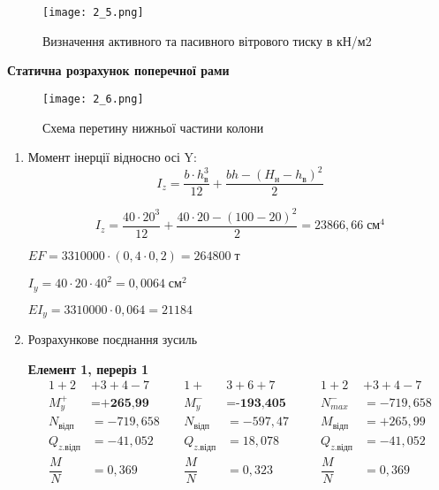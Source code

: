 \documentclass[a4paper,14pt]{article}
\begin{document}
\begin{figure}[h!]
    \begin{center}
        \texttt{[image: 2\_5.png]}
        \caption{Визначення активного та пасивного вітрового тиску в кН/м2}\label{ris2_5} 
    \end{center}
\end{figure}
\textbf{Статична розрахунок поперечної рами} 
\begin{figure}[h!]
    \begin{center}
        \texttt{[image: 2\_6.png]}
        \caption{Схема перетину нижньої частини колони}\label{ris2_6} 
    \end{center}
\end{figure}
\begin{enumerate}
    \item Момент інерції відносно осі Y:
    \begin{equation}
        I_z = \dfrac{b\cdot h^3_\textit{в}}{12}+\dfrac{bh-(H_\textit{н}-h_\textit{в})^2}{2} 
    \end{equation}
    
    $$I_z = \dfrac{40\cdot 20^3}{12}+\dfrac{40\cdot 20-(100-20)^2}{2}=23866,66\;\textit{см}^4$$

    $EF=3310000\cdot (0,4\cdot 0,2) = 264800\;\textit{т}$

    $I_y = 40 \cdot 20\cdot 40^2 = 0,0064\;\textit{см}^2$

    $EI_y = 3310000\cdot 0,064 = 21184$

    \item Розрахункове поєднання зусиль
    
    \textbf{Елемент 1, переріз 1}
    \begin{equation*}
        \begin{aligned}
        1+2&+3+4-7\qquad  &1+&3+6+7 &1+2&+3+4-7\\
        M^+_y &= \textbf{+265,99} &M^-_y &= \textbf{-193,405}\qquad &N^-_{max} &= -719,658\\
        N_\textit{відп} &= -719,658  &N_\textit{відп} &= -597,47 &M_\textit{відп} &= +265,99 \\
        Q_\textit{z.відп} &= -41,052 &Q_\textit{z.відп} &= 18,078 &Q_\textit{z.відп} &= -41,052 \\
        \dfrac{M}{N}&=0,369  &\dfrac{M}{N}&=0,323 &\dfrac{M}{N}&=0,369 
        \end{aligned}
    \end{equation*}
 

\end{enumerate}
\end{document}

